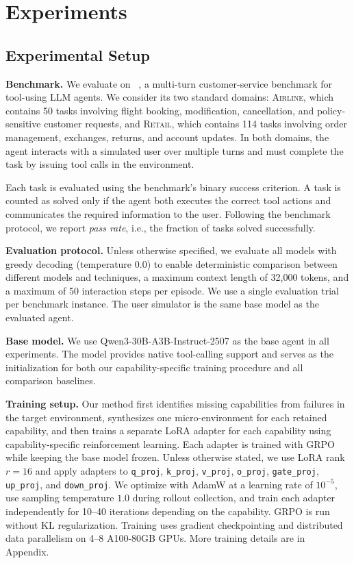 
\section{Experiments}

\subsection{Experimental Setup}

\noindent\textbf{Benchmark.}
We evaluate on \tbench~\citep{barres2025tau2benchevaluatingconversationalagents}, a multi-turn customer-service benchmark for tool-using LLM agents. We consider its two standard domains: \textsc{Airline}, which contains 50 tasks involving flight booking, modification, cancellation, and policy-sensitive customer requests, and \textsc{Retail}, which contains 114 tasks involving order management, exchanges, returns, and account updates. In both domains, the agent interacts with a simulated user over multiple turns and must complete the task by issuing tool calls in the environment.

Each task is evaluated using the benchmark's binary success criterion. A task is counted as solved only if the agent both executes the correct tool actions and communicates the required information to the user. Following the benchmark protocol, we report \emph{pass rate}, i.e., the fraction of tasks solved successfully.

\noindent\textbf{Evaluation protocol.}
Unless otherwise specified, we evaluate all models with greedy decoding (temperature $0.0$) to enable deterministic comparison between different models and techniques, a maximum context length of 32{,}000 tokens, and a maximum of 50 interaction steps per episode. We use a single evaluation trial per benchmark instance. The user simulator is the same base model as the evaluated agent.

\noindent\textbf{Base model.}
We use Qwen3-30B-A3B-Instruct-2507 as the base agent in all experiments. The model provides native tool-calling support and serves as the initialization for both our capability-specific training procedure and all comparison baselines.

\noindent\textbf{Training setup.}
Our method first identifies missing capabilities from failures in the target environment, synthesizes one micro-environment for each retained capability, and then trains a separate LoRA adapter for each capability using capability-specific reinforcement learning. Each adapter is trained with GRPO while keeping the base model frozen. Unless otherwise stated, we use LoRA rank $r=16$ and apply adapters to \texttt{q\_proj}, \texttt{k\_proj}, \texttt{v\_proj}, \texttt{o\_proj}, \texttt{gate\_proj}, \texttt{up\_proj}, and \texttt{down\_proj}. We optimize with AdamW at a learning rate of $10^{-5}$, use sampling temperature $1.0$ during rollout collection, and train each adapter independently for 10--40 iterations depending on the capability. GRPO is run without KL regularization. Training uses gradient checkpointing and distributed data parallelism on 4--8 A100-80GB GPUs. More training details are in Appendix. 

